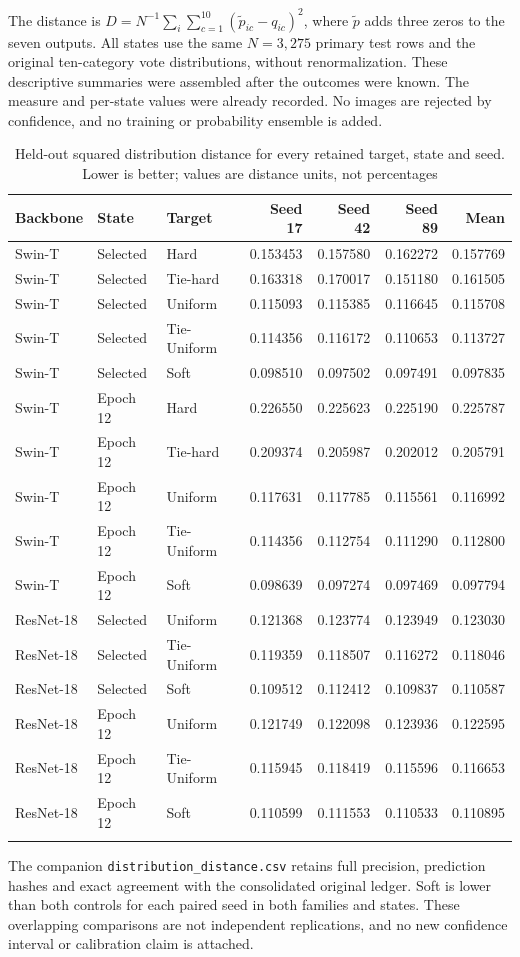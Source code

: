 The distance is $D=N^{-1}\sum_i\sum_{c=1}^{10}(\tilde p_{ic}-q_{ic})^2$, where $\tilde p$ adds three zeros to the seven outputs. All states use the same $N=3,275$ primary test rows and the original ten-category vote distributions, without renormalization. These descriptive summaries were assembled after the outcomes were known. The measure and per-state values were already recorded. No images are rejected by confidence, and no training or probability ensemble is added.
\begin{table}[H]\caption{Held-out squared distribution distance for every retained target, state and seed. Lower is better; values are distance units, not percentages}\label{tab:distributionseeds}
\centering\small\begin{tabular}{lllrrrr}\toprule
Backbone & State & Target & Seed 17 & Seed 42 & Seed 89 & Mean\\\midrule
Swin-T & Selected & Hard & 0.153453 & 0.157580 & 0.162272 & 0.157769\\
Swin-T & Selected & Tie-hard & 0.163318 & 0.170017 & 0.151180 & 0.161505\\
Swin-T & Selected & Uniform & 0.115093 & 0.115385 & 0.116645 & 0.115708\\
Swin-T & Selected & Tie-Uniform & 0.114356 & 0.116172 & 0.110653 & 0.113727\\
Swin-T & Selected & Soft & 0.098510 & 0.097502 & 0.097491 & 0.097835\\
\addlinespace
Swin-T & Epoch 12 & Hard & 0.226550 & 0.225623 & 0.225190 & 0.225787\\
Swin-T & Epoch 12 & Tie-hard & 0.209374 & 0.205987 & 0.202012 & 0.205791\\
Swin-T & Epoch 12 & Uniform & 0.117631 & 0.117785 & 0.115561 & 0.116992\\
Swin-T & Epoch 12 & Tie-Uniform & 0.114356 & 0.112754 & 0.111290 & 0.112800\\
Swin-T & Epoch 12 & Soft & 0.098639 & 0.097274 & 0.097469 & 0.097794\\
\addlinespace
ResNet-18 & Selected & Uniform & 0.121368 & 0.123774 & 0.123949 & 0.123030\\
ResNet-18 & Selected & Tie-Uniform & 0.119359 & 0.118507 & 0.116272 & 0.118046\\
ResNet-18 & Selected & Soft & 0.109512 & 0.112412 & 0.109837 & 0.110587\\
\addlinespace
ResNet-18 & Epoch 12 & Uniform & 0.121749 & 0.122098 & 0.123936 & 0.122595\\
ResNet-18 & Epoch 12 & Tie-Uniform & 0.115945 & 0.118419 & 0.115596 & 0.116653\\
ResNet-18 & Epoch 12 & Soft & 0.110599 & 0.111553 & 0.110533 & 0.110895\\
\addlinespace
\bottomrule\end{tabular}\end{table}
The companion \texttt{distribution\_distance.csv} retains full precision, prediction hashes and exact agreement with the consolidated original ledger. Soft is lower than both controls for each paired seed in both families and states. These overlapping comparisons are not independent replications, and no new confidence interval or calibration claim is attached.
